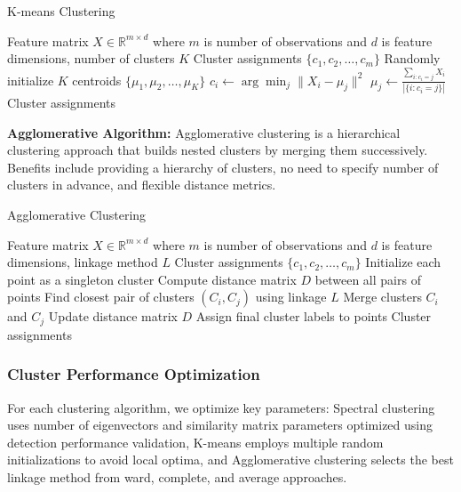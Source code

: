 \documentclass[pdflatex,sn-mathphys-num]{sn-jnl}%
\theoremstyle{thmstyleone}
\theoremstyle{thmstyletwo}
\theoremstyle{thmstylethree}
\begin{document}
\begin{algorithm}[H]
\caption{K-means Clustering}
\label{alg:kmeans_traditional}
\begin{algorithmic}[1]
\Require Feature matrix $X \in \mathbb{R}^{m \times d}$ where $m$ is number of observations and $d$ is feature dimensions, number of clusters $K$
\Ensure Cluster assignments $\{c_1, c_2, \ldots, c_m\}$
\State Randomly initialize $K$ centroids $\{\mu_1, \mu_2, \ldots, \mu_K\}$
\Repeat
        \State $c_i \leftarrow \arg\min_j \|X_i - \mu_j\|^2$ 
    \EndFor
        \State $\mu_j \leftarrow \frac{\sum_{i:c_i=j} X_i}{|\{i:c_i=j\}|}$ 
    \EndFor
{}
\State \Return Cluster assignments
\end{algorithmic}
\end{algorithm}

\textbf{Agglomerative Algorithm:} Agglomerative clustering is a hierarchical clustering approach that builds nested clusters by merging them successively. Benefits include providing a hierarchy of clusters, no need to specify number of clusters in advance, and flexible distance metrics.

\begin{algorithm}[H]
\caption{Agglomerative Clustering}
\label{alg:agglomerative_traditional}
\begin{algorithmic}[1]
\Require Feature matrix $X \in \mathbb{R}^{m \times d}$ where $m$ is number of observations and $d$ is feature dimensions, linkage method $L$
\Ensure Cluster assignments $\{c_1, c_2, \ldots, c_m\}$
\State Initialize each point as a singleton cluster
\State Compute distance matrix $D$ between all pairs of points
    \State Find closest pair of clusters $(C_i, C_j)$ using linkage $L$
    \State Merge clusters $C_i$ and $C_j$
    \State Update distance matrix $D$
\EndWhile
\State Assign final cluster labels to points
\State \Return Cluster assignments
\end{algorithmic}
\end{algorithm}

\subsubsection{Cluster Performance Optimization}

For each clustering algorithm, we optimize key parameters: Spectral clustering uses number of eigenvectors and similarity matrix parameters optimized using detection performance validation, K-means employs multiple random initializations to avoid local optima, and Agglomerative clustering selects the best linkage method from ward, complete, and average approaches.
\end{document}

